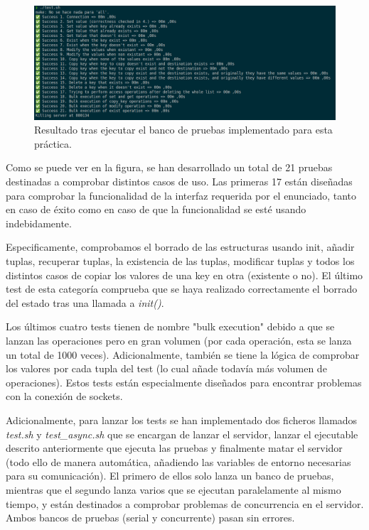 \begin{figure}[H]
    \includegraphics[width=\textwidth]{img/tests.png}
    \caption{Resultado tras ejecutar el banco de pruebas implementado para esta práctica.}
    \label{fig:tests}
\end{figure}

Como se puede ver en la figura, se han desarrollado un total de 21 pruebas destinadas a comprobar distintos casos de uso. Las primeras 17 están diseñadas para comprobar la funcionalidad de la interfaz requerida por el enunciado, tanto en caso de éxito como en caso de que la funcionalidad se esté usando indebidamente. 

Especificamente, comprobamos el borrado de las estructuras usando init, añadir tuplas, recuperar tuplas, la existencia de las tuplas, modificar tuplas y  todos los distintos casos de copiar los valores de una key en otra (existente o no).
El último test de esta categoría comprueba que se haya realizado correctamente el borrado del estado tras una llamada a \textit{init()}.

Los últimos cuatro tests tienen de nombre "bulk execution" debido a que se lanzan las operaciones pero en gran volumen (por cada operación, esta se lanza un total de 1000 veces). Adicionalmente, también se tiene la lógica de comprobar los valores por cada tupla del test (lo cual añade todavía más volumen de operaciones). Estos tests están especialmente diseñados para encontrar problemas con la conexión de sockets.

Adicionalmente, para lanzar los tests se han implementado dos ficheros llamados \textit{test.sh} y \textit{test\_async.sh} que se encargan de lanzar el servidor, lanzar el ejecutable descrito anteriormente que ejecuta las pruebas y finalmente matar el servidor (todo ello de manera automática, añadiendo las variables de entorno necesarias para su comunicación).
El primero de ellos solo lanza un banco de pruebas, mientras que el segundo lanza varios que se ejecutan paralelamente al mismo tiempo, y están destinados a comprobar problemas de concurrencia en el servidor.
Ambos bancos de pruebas (serial y concurrente) pasan sin errores.

